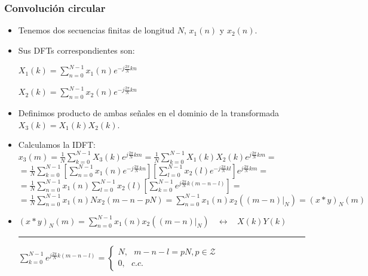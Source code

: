 \begin{frame}
\frametitle{Convolución circular}

\footnotesize
\begin{itemize}
\item Tenemos dos secuencias finitas de longitud $N$, $x_1(n)$ y $x_2(n)$.
\item Sus DFTs correspondientes son:

\hspace{1cm}$X_1(k)=\sum_{n=0}^{N-1}x_1(n)e^{-j \frac{2\pi}{N}kn}$

\hspace{1cm}$X_2(k)=\sum_{n=0}^{N-1}x_2(n)e^{-j \frac{2\pi}{N}kn}$

\item Definimos producto de ambas señales en el dominio de la transformada $X_3(k)=X_1(k)X_2(k)$.

\item Calculamos la IDFT:
$x_3(m)=\frac{1}{N}\sum_{k=0}^{N-1} X_3(k)e^{j \frac{2\pi}{N}km}=\frac{1}{N}\sum_{k=0}^{N-1} X_1(k)X_2(k)e^{j \frac{2\pi}{N}km}=$
$=\frac{1}{N}\sum_{k=0}^{N-1} \left[\sum_{n=0}^{N-1}x_1(n)e^{-j \frac{2\pi}{N}kn} \right] \left[\sum_{l=0}^{N-1}x_2(l)e^{-j \frac{2\pi}{N}kl} \right]e^{j \frac{2\pi}{N}km}=$
$=\frac{1}{N}\sum_{n=0}^{N-1} x_1(n)  \sum_{l=0}^{N-1}x_2(l) \left[ \sum_{k=0}^{N-1}e^{j \frac{2\pi}{N}k(m-n-l)} \right ]=$
$=\frac{1}{N}\sum_{n=0}^{N-1} x_1(n) N x_2(m-n-pN)=\sum_{n=0}^{N-1} x_1(n) x_2((m-n)|_N)=(x*y)_N(m)$

\item \alert{$(x*y)_N(m)=\sum_{n=0}^{N-1} x_1(n) x_2((m-n)|_N)  \:\:\:\:   \leftrightarrow \:\:\:\: X(k)Y(k)$}

\rule{11cm}{0.4pt}

$\sum_{k=0}^{N-1}e^{j \frac{2\pi}{N}k(m-n-l)} = \left \{\begin{array}{l} N,   \:\:\: m-n-l=pN, p\in \mathcal{Z} \\ 0,  \:\:\: c.c. \end{array}\right .$


\end{itemize}


\end{frame}


